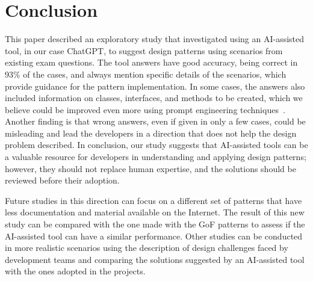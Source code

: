 \documentclass[runningheads]{llncs}
\begin{document}

\section{Conclusion}\label{sec6}

This paper described an exploratory study that investigated using an AI-assisted tool, in our case ChatGPT, to suggest design patterns using scenarios from existing exam questions. The tool answers have good accuracy, being correct in 93\% of the cases, and always mention specific details of the scenarios, which provide guidance for the pattern implementation. In some cases, the answers also included information on classes, interfaces, and methods to be created, which we believe could be improved even more using prompt engineering techniques~\cite{white2023chatgpt}. Another finding is that wrong answers, even if given in only a few cases, could be misleading and lead the developers in a direction that does not help the design problem described. In conclusion, our study suggests that AI-assisted tools can be a valuable resource for developers in understanding and applying design patterns; however, they should not replace human expertise, and the solutions should be reviewed before their adoption.

Future studies in this direction can focus on a different set of patterns that have less documentation and material available on the Internet. The result of this new study can be compared with the one made with the GoF patterns to assess if the AI-assisted tool can have a similar performance. Other studies can be conducted in more realistic scenarios using the description of design challenges faced by development teams and comparing the solutions suggested by an AI-assisted tool with the ones adopted in the projects.






\end{document}
